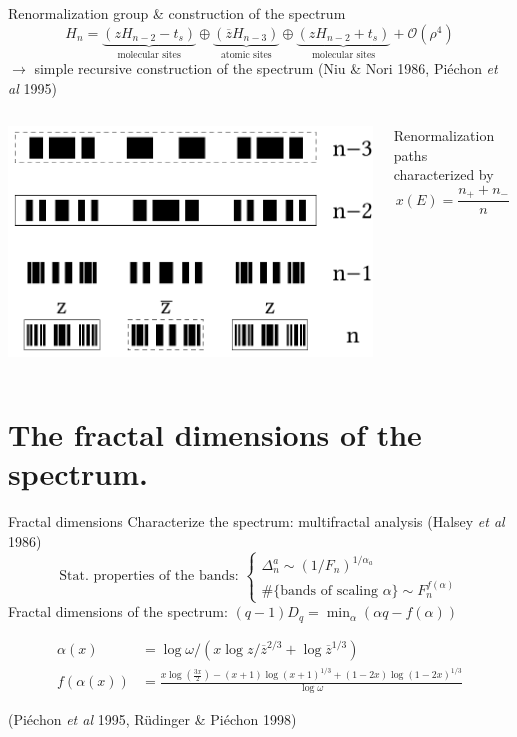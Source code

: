 \documentclass[xcolor=x11names,compress,professionalfonts]{beamer}
\renewcommand{\(}{\begin{columns}}
\renewcommand{\)}{\end{columns}}
\newcommand{\<}[1]{\begin{column}{#1}}
\renewcommand{\>}{\end{column}}
\newcommand{\zb}{\ensuremath{\overline{z}}}
\begin{document}
\begin{frame}{Renormalization group \& construction of the spectrum}
 \[ H_n = \underbrace{\left( z H_{n-2} - t_s \right)}_{\text{molecular sites}} \oplus \underbrace{\left( \zb H_{n-3} \right)}_{\text{atomic sites}} \oplus \underbrace{\left( z H_{n-2} + t_s \right)}_{\text{molecular sites}} + \mathcal{O}(\rho^4)\]
	$\rightarrow$ simple recursive construction of the spectrum (Niu \& Nori 1986, Piéchon \emph{et al} 1995)
	
	\begin{columns}
	\begin{column}{6cm}
	\centering
	\includegraphics[scale=.45]{recursive_construction_spectrum.pdf}
	\end{column}
	\begin{column}{6cm}
	
	Renormalization paths characterized by
	\[ x(E) = \frac{n_+ + n_-}{n} \]
	\end{column}
	\end{columns}
\end{frame}

\section{The fractal dimensions of the spectrum.}
\begin{frame}{Fractal dimensions}
	Characterize the spectrum: multifractal analysis (Halsey \emph{et al} 1986)
	\[
	\text{Stat. properties of the bands:~} 
	\begin{cases}
	\Delta_n^a \sim (1/F_n)^{1/\alpha_a} \\
	\#\{\text{bands of scaling~} \alpha \} \sim F_n^{f(\alpha)} 
	\end{cases}
	\]
	Fractal dimensions of the spectrum: $(q-1)D_q = \min_\alpha(\alpha q - f(\alpha))$
	
	\begin{align*}
		\alpha(x) &= \log \omega/\left( x \log z/\zb^{2/3} + \log \zb^{1/3} \right) \\
		f(\alpha(x)) &= \frac{x \log \left(\frac{3 x}{2}\right)- (x+1) \log (x+1)^{1/3}+ (1-2 x) \log (1-2 x)^{1/3}}{\log \omega}
	\end{align*}
	
	\begin{flushright}
	(Piéchon \emph{et al} 1995, Rüdinger \& Piéchon 1998)
	\end{flushright}
\end{frame}
\end{document}
